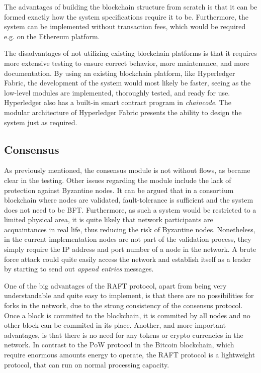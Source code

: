 The advantages of building the blockchain structure from scratch is that it can be formed exactly how the system specifications require it to be. Furthermore, the system can be implemented without transaction fees, which would be required e.g. on the Ethereum platform. 

The disadvantages of not utilizing existing blockchain platforms is that it requires more extensive testing to ensure correct behavior, more maintenance, and more documentation. By using an existing blockchain platform, like Hyperledger Fabric, the development of the system would most likely be faster, seeing as the low-level modules are implemented, thoroughly tested, and ready for use. Hyperledger also has a built-in smart contract program in \textit{chaincode}. The modular architecture of Hyperledger Fabric presents the ability to design the system just as required.

 
\subsection*{Consensus}
As previously mentioned, the consensus module is not without flows, as became clear in the testing. Other issues regarding the module include the lack of protection against Byzantine nodes. It can be argued that in a consortium blockchain where nodes are validated, fault-tolerance is sufficient and the system does not need to be BFT. Furthermore, as such a system would be restricted to a limited physical area, it is quite likely that network participants are acquaintances in real life, thus reducing the risk of Byzantine nodes. Nonetheless, in the current implementation nodes are not part of the validation process, they simply require the IP address and port number of a node in the network. A brute force attack could quite easily access the network and establish itself as a leader by starting to send out \textit{append entries} messages.  

One of the big advantages of the RAFT protocol, apart from being very understandable and quite easy to implement, is that there are no possibilities for forks in the network, due to the strong consistency of the consensus protocol. Once a block is commited to the blockchain, it is commited by all nodes and no other block can be commited in its place. Another, and more important advantages, is that there is no need for any tokens or crypto currencies in the network. In contrast to the PoW protocol in the Bitcoin blockchain, which require enormous amounts energy to operate, the RAFT protocol is a lightweight protocol, that can run on normal processing capacity.

